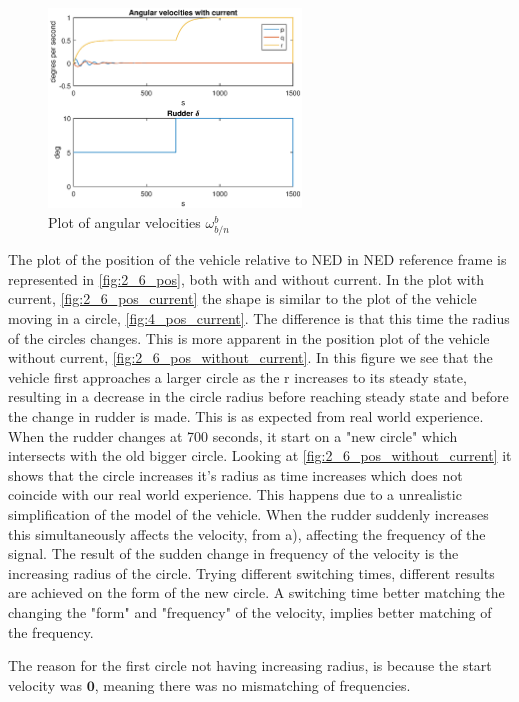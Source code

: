 \begin{figure}[!ht]
	\centering
	\includegraphics[width=0.6\textwidth]{figures/2_6_ang_vel.eps}
	\caption{Plot of angular velocities $\omega^b_{b/n}$}
	\label{fig:2_6_ang_vel}
\end{figure}

The plot of the position of the vehicle relative to NED in NED reference frame is represented in \ref{fig:2_6_pos}, both with and without current. In the plot with current,  \ref{fig:2_6_pos_current} the shape is similar to the plot of the vehicle moving in a circle, \ref{fig:4_pos_current}. The difference is that this time the radius of the circles changes. This is more apparent in the position plot of the vehicle without current,  \ref{fig:2_6_pos_without_current}. In this figure we see that the vehicle first approaches a larger circle as the r increases to its steady state, resulting in a decrease in the circle radius before reaching steady state and before the change in rudder is made. This is as expected from real world experience. When the rudder changes at 700 seconds, it start on a "new circle" which intersects with the old bigger circle. Looking at \ref{fig:2_6_pos_without_current} it shows that the circle increases it's radius as time increases which does not coincide with our real world experience. This happens due to a unrealistic simplification of the model of the vehicle. When the rudder suddenly increases this simultaneously affects the velocity, from  a), affecting the frequency of the signal. The result of the sudden change in frequency of the velocity is the increasing radius of the circle. Trying different switching times, different results are achieved on the form of the new circle. A switching time better matching the changing the "form" and "frequency" of the velocity, implies better matching of the frequency.  

The reason for the first circle not having increasing radius, is because the start velocity was $\mathbf{0}$, meaning there was no mismatching of frequencies.  

